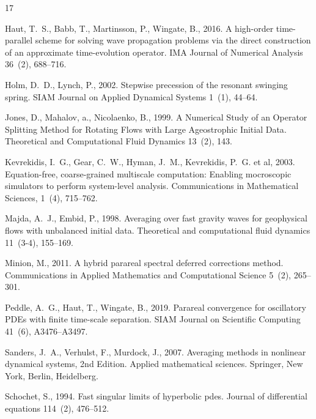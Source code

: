 \documentclass[a4,12pt]{article}
\renewenvironment{thebibliography}[1]{%
    \begin{oldthebibliography}{#1}%
    \setlength{\parskip}{0ex}%
    \setlength{\itemsep}{0ex}%
}%
                 {%
  \end{oldthebibliography}%
                 }
\begin{document}
\begin{thebibliography}{17}
Haut, T.~S., Babb, T., Martinsson, P., Wingate, B., 2016. A high-order
  time-parallel scheme for solving wave propagation problems via the direct
  construction of an approximate time-evolution operator. IMA Journal of
  Numerical Analysis 36~(2), 688--716.

Holm, D.~D., Lynch, P., 2002. Stepwise precession of the resonant swinging
  spring. SIAM Journal on Applied Dynamical Systems 1~(1), 44--64.

Jones, D., Mahalov, a., Nicolaenko, B., 1999. {A Numerical Study of an Operator
  Splitting Method for Rotating Flows with Large Ageostrophic Initial Data}.
Theoretical and Computational Fluid Dynamics 13~(2), 143.

  Kevrekidis, I.~G., Gear, C.~W., Hyman, J.~M., Kevrekidis, P.~G. et al,
  2003. {Equation-free, coarse-grained multiscale computation: Enabling mocroscopic simulators to perform system-level analysis}. Communications in Mathematical Sciences, 1~(4), 715--762.

Majda, A.~J., Embid, P., 1998. Averaging over fast gravity waves for
  geophysical flows with unbalanced initial data. Theoretical and computational
  fluid dynamics 11~(3-4), 155--169.

Minion, M., 2011. A hybrid parareal spectral deferred corrections method.
  Communications in Applied Mathematics and Computational Science 5~(2),
  265--301.

Peddle, A.~G., Haut, T., Wingate, B., 2019. Parareal convergence for
  oscillatory {PDE}s with finite time-scale separation. SIAM Journal on
  Scientific Computing 41~(6), A3476--A3497.

Sanders, J.~A., Verhulst, F., Murdock, J., 2007. Averaging methods in nonlinear
  dynamical systems, 2nd Edition. Applied mathematical sciences. Springer, New
  York, Berlin, Heidelberg.

Schochet, S., 1994. Fast singular limits of hyperbolic pdes. Journal of
  differential equations 114~(2), 476--512.


\end{thebibliography}
\end{document}
